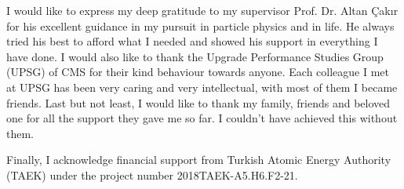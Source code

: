 \vspace*{-6pt}
I would like to express my deep gratitude to my supervisor Prof. Dr. Altan Çakır for his excellent guidance in my pursuit in particle physics and in life. He always tried his best to afford what I needed and showed his support in everything I have done. I would also like to thank the Upgrade Performance Studies Group (UPSG) of CMS for their kind behaviour towards anyone. Each colleague I met at UPSG has been very caring and very intellectual, with most of them I became friends. Last but not least, I would like to thank my family, friends and beloved one for all the support they gave me so far. I couldn't have achieved this without them.

Finally, I acknowledge financial support from Turkish Atomic Energy Authority (TAEK) under the project number 2018TAEK-A5.H6.F2-21.